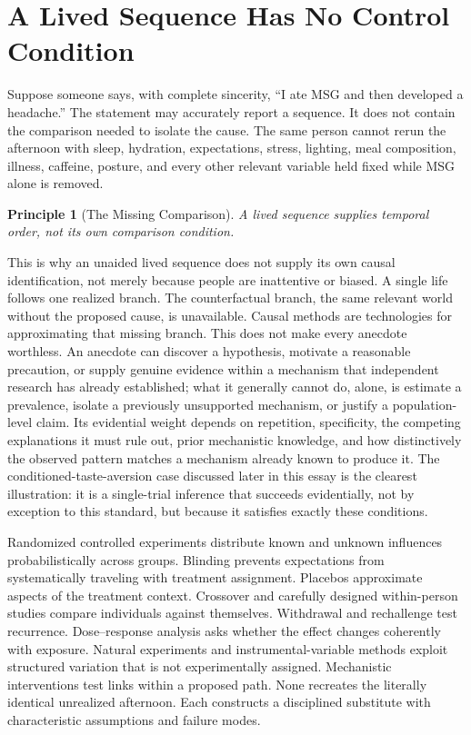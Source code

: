 \documentclass[11pt]{article}
\newtheorem*{principle}{Principle}
\begin{document}
\section{A Lived Sequence Has No Control Condition}

Suppose someone says, with complete sincerity, ``I ate MSG and then developed a headache.'' The statement may accurately report a sequence. It does not contain the comparison needed to isolate the cause. The same person cannot rerun the afternoon with sleep, hydration, expectations, stress, lighting, meal composition, illness, caffeine, posture, and every other relevant variable held fixed while MSG alone is removed.

\begin{principle}[The Missing Comparison]
A lived sequence supplies temporal order, not its own comparison condition.
\end{principle}

This is why an unaided lived sequence does not supply its own causal identification, not merely because people are inattentive or biased. A single life follows one realized branch. The counterfactual branch, the same relevant world without the proposed cause, is unavailable. Causal methods are technologies for approximating that missing branch. This does not make every anecdote worthless. An anecdote can discover a hypothesis, motivate a reasonable precaution, or supply genuine evidence within a mechanism that independent research has already established; what it generally cannot do, alone, is estimate a prevalence, isolate a previously unsupported mechanism, or justify a population-level claim. Its evidential weight depends on repetition, specificity, the competing explanations it must rule out, prior mechanistic knowledge, and how distinctively the observed pattern matches a mechanism already known to produce it. The conditioned-taste-aversion case discussed later in this essay is the clearest illustration: it is a single-trial inference that succeeds evidentially, not by exception to this standard, but because it satisfies exactly these conditions.

Randomized controlled experiments distribute known and unknown influences probabilistically across groups. Blinding prevents expectations from systematically traveling with treatment assignment. Placebos approximate aspects of the treatment context. Crossover and carefully designed within-person studies compare individuals against themselves. Withdrawal and rechallenge test recurrence. Dose--response analysis asks whether the effect changes coherently with exposure. Natural experiments and instrumental-variable methods exploit structured variation that is not experimentally assigned. Mechanistic interventions test links within a proposed path. None recreates the literally identical unrealized afternoon. Each constructs a disciplined substitute with characteristic assumptions and failure modes.
\end{document}
